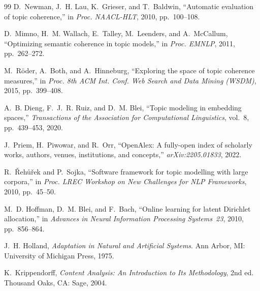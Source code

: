 \begin{thebibliography}{99}
D.~Newman, J.~H. Lau, K.~Grieser, and T.~Baldwin, ``Automatic evaluation of topic coherence,'' in
\emph{Proc. NAACL-HLT}, 2010, pp.~100--108.

D.~Mimno, H.~M. Wallach, E.~Talley, M.~Leenders, and A.~McCallum, ``Optimizing semantic coherence
in topic models,'' in \emph{Proc. EMNLP}, 2011, pp.~262--272.

M.~R\"{o}der, A.~Both, and A.~Hinneburg, ``Exploring the space of topic coherence measures,'' in
\emph{Proc. 8th ACM Int. Conf. Web Search and Data Mining (WSDM)}, 2015, pp.~399--408.

A.~B. Dieng, F.~J.~R. Ruiz, and D.~M. Blei, ``Topic modeling in embedding spaces,''
\emph{Transactions of the Association for Computational Linguistics}, vol.~8, pp.~439--453, 2020.

J.~Priem, H.~Piwowar, and R.~Orr, ``OpenAlex: A fully-open index of scholarly works, authors,
venues, institutions, and concepts,'' \emph{arXiv:2205.01833}, 2022.

R.~\v{R}eh\r{u}\v{r}ek and P.~Sojka, ``Software framework for topic modelling with large corpora,''
in \emph{Proc. LREC Workshop on New Challenges for NLP Frameworks}, 2010, pp.~45--50.

M.~D. Hoffman, D.~M. Blei, and F.~Bach, ``Online learning for latent Dirichlet allocation,'' in
\emph{Advances in Neural Information Processing Systems~23}, 2010, pp.~856--864.

J.~H. Holland, \emph{Adaptation in Natural and Artificial Systems}. Ann Arbor, MI: University of
Michigan Press, 1975.

K.~Krippendorff, \emph{Content Analysis: An Introduction to Its Methodology}, 2nd ed. Thousand
Oaks, CA: Sage, 2004.

\end{thebibliography}
